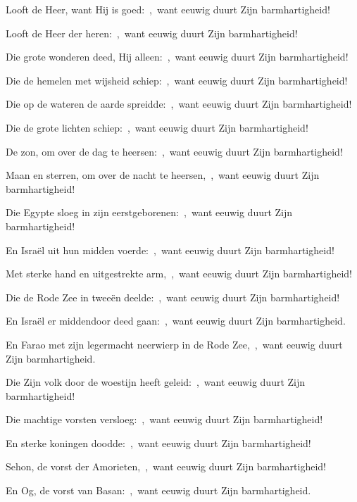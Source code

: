\documentclass[12pt,twoside,a5paper]{article}
\begin{document}
\begin{halfparskip}

   Looft de Heer, want Hij is goed:~\sep\ want eeuwig duurt Zijn barmhartigheid!


  Looft de Heer der heren:~\sep\ want eeuwig duurt Zijn barmhartigheid!

  Die grote wonderen deed, Hij alleen:~\sep\ want eeuwig duurt Zijn barmhartigheid!

  Die de hemelen met wijsheid schiep:~\sep\ want eeuwig duurt Zijn barmhartigheid!

  Die op de wateren de aarde spreidde:~\sep\ want eeuwig duurt Zijn barmhartigheid!

  Die de grote lichten schiep:~\sep\ want eeuwig duurt Zijn barmhartigheid!

  De zon, om over de dag te heersen:~\sep\ want eeuwig duurt Zijn barmhartigheid!

  Maan en sterren, om over de nacht te heersen,~\sep\ want eeuwig duurt Zijn barmhartigheid!

  Die Egypte sloeg in zijn eerstgeborenen:~\sep\ want eeuwig duurt Zijn barmhartigheid!

  En Israël uit hun midden voerde:~\sep\ want eeuwig duurt Zijn barmhartigheid!

  Met sterke hand en uitgestrekte arm,~\sep\ want eeuwig duurt Zijn barmhartigheid!

  Die de Rode Zee in tweeën deelde:~\sep\ want eeuwig duurt Zijn barmhartigheid!

  En Israël er middendoor deed gaan:~\sep\ want eeuwig duurt Zijn barmhartigheid.

  En Farao met zijn legermacht neerwierp in de Rode Zee,~\sep\ want eeuwig duurt Zijn barmhartigheid.

  Die Zijn volk door de woestijn heeft geleid:~\sep\ want eeuwig duurt Zijn barmhartigheid!

  Die machtige vorsten versloeg:~\sep\ want eeuwig duurt Zijn barmhartigheid!

  En sterke koningen doodde:~\sep\ want eeuwig duurt Zijn barmhartigheid!

  Sehon, de vorst der Amorieten,~\sep\ want eeuwig duurt Zijn barmhartigheid!

  En Og, de vorst van Basan:~\sep\ want eeuwig duurt Zijn barmhartigheid.


\end{halfparskip}
\end{document}
